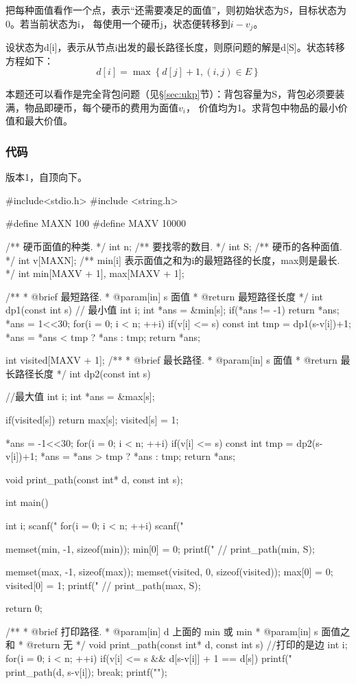 把每种面值看作一个点，表示“还需要凑足的面值”，则初始状态为S，目标状态为0。若当前状态为i，
每使用一个硬币j，状态便转移到$i-v_j$。

设状态为d[i]，表示从节点i出发的最长路径长度，则原问题的解是d[S]。状态转移方程如下：
$$d[i]=\max\left\{d[j]+1,(i,j) \in E\right\}$$

本题还可以看作是完全背包问题（见\S \ref{sec:ukp}节）：背包容量为S，背包必须要装满，物品即硬币，每个硬币的费用为面值$v_i$，
价值均为1。求背包中物品的最小价值和最大价值。

\subsubsection{代码}
版本1，自顶向下。

\begin{Codex}[label=coin_change.c]
#include<stdio.h>
#include <string.h>

#define MAXN 100
#define MAXV 10000

/** 硬币面值的种类. */
int n;
/** 要找零的数目. */
int S;
/** 硬币的各种面值. */
int v[MAXN];
/** min[i] 表示面值之和为i的最短路径的长度，max则是最长. */
int min[MAXV + 1], max[MAXV + 1];

/**
 * @brief 最短路径.
 * @param[in] s 面值
 * @return 最短路径长度
 */
int dp1(const int s) { // 最小值
    int i;
    int *ans = &min[s];
    if(*ans != -1) return *ans;
    *ans = 1<<30;
    for(i = 0; i < n; ++i) if(v[i] <= s) {
        const int tmp = dp1(s-v[i])+1;
        *ans = *ans < tmp ? *ans : tmp;
    }
    return *ans;
}

int visited[MAXV + 1];
/**
 * @brief 最长路径.
 * @param[in] s 面值
 * @return 最长路径长度
 */
int dp2(const int s) { //最大值 
    int i;
    int *ans = &max[s];

    if(visited[s]) return max[s];
    visited[s] = 1;

    *ans = -1<<30;
    for(i = 0; i < n; ++i) if(v[i] <= s) {
        const int tmp = dp2(s-v[i])+1;
        *ans = *ans > tmp ? *ans : tmp;
    }
    return *ans;
}

void print_path(const int* d, const int s);

int main() {
    int i;
    scanf("%
    for(i = 0; i < n; ++i) scanf("%

    memset(min, -1, sizeof(min));
    min[0] = 0;
    printf("%
    // print_path(min, S);

    memset(max, -1, sizeof(max));
    memset(visited, 0, sizeof(visited));
    max[0] = 0; visited[0] = 1;
    printf("%
    // print_path(max, S);

    return 0;
}

/**
 * @brief 打印路径.
 * @param[in] d 上面的 min 或 min
 * @param[in] s 面值之和
 * @return 无
 */
void print_path(const int* d, const int s) {//打印的是边
    int i;
    for(i = 0; i < n; ++i) if(v[i] <= s && d[s-v[i]] + 1 == d[s]) {
        printf("%
        print_path(d, s-v[i]);
        break;
    }
    printf("\n");
}
\end{Codex}

